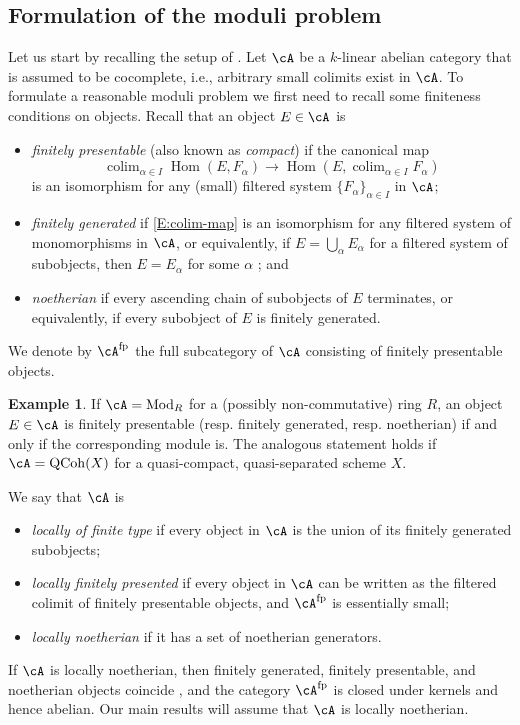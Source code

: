 \documentclass[a4paper]{amsart}
\numberwithin{equation}{section}
\theoremstyle{plain}
\theoremstyle{definition}
\newtheorem{example}[thm]{Example}
\DeclareMathOperator{\Hom}{Hom}
\DeclareMathOperator{\Mod}{Mod}
\DeclareMathOperator{\colim}{colim}
\DeclareMathOperator{\QCoh}{QCoh}
\begin{document}
\subsection{Formulation of the moduli problem}
Let us start by recalling the setup of \cite{artin-zhang}. Let $\cA$ be a $k$-linear abelian category that is assumed to be cocomplete, i.e., arbitrary small colimits exist in $\cA$. To formulate a reasonable moduli problem we first need to recall some finiteness conditions on objects.
Recall that an object $E \in \cA$ is
\begin{itemize}
	\item \emph{finitely presentable} (also known as \emph{compact}) if the canonical map 
	\begin{equation} \label{E:colim-map}
	\colim_{\alpha \in I} \Hom(E,F_\alpha) \to \Hom(E,\colim_{\alpha \in I} F_\alpha)
	\end{equation}
	is an isomorphism for any (small) filtered system $\{F_{\alpha}\}_{\alpha \in I}$ in $\cA$;  
	\item \emph{finitely generated} if \eqref{E:colim-map}  is an isomorphism for any filtered system of monomorphisms in $\cA$, or equivalently, if $E = \bigcup_\alpha E_\alpha$ for a filtered system of subobjects, then $E = E_\alpha$ for some $\alpha$ \cite[Prop.~3.5.6]{popescu}; and
	\item \emph{noetherian} if every ascending chain of subobjects of $E$ terminates, or equivalently, if every subobject of $E$ is finitely generated.
\end{itemize}
We denote by $\cA^{\rm{fp}}$ the full subcategory of $\cA$ consisting of finitely presentable objects.

\begin{example}  If $\cA = \Mod_R$ for a (possibly non-commutative) ring $R$, an object $E \in \cA$ is finitely presentable (resp. finitely generated, resp. noetherian) if and only if the corresponding module is.  The analogous statement holds if $\cA = \QCoh(X)$ for a quasi-compact, quasi-separated scheme $X$. 
\end{example} 
We say that $\cA$ is
\begin{itemize}
	\item \emph{locally of finite type} if every object in $\cA$ is the union of its finitely generated subobjects; 
	\item \emph{locally finitely presented} if every object in $\cA$ can be written as the filtered colimit of finitely presentable objects, and $\cA^{\rm{fp}}$ is essentially small; 
	\item \emph{locally noetherian} if it has a set of noetherian generators.
\end{itemize}
If $\cA$ is locally noetherian, then finitely generated, finitely presentable, and noetherian objects coincide \cite[Prop.~B1.3]{artin-zhang}, and the category $\cA^{\rm{fp}}$ is closed under kernels and hence abelian. Our main results will assume that $\cA$ is locally noetherian.
\end{document}
